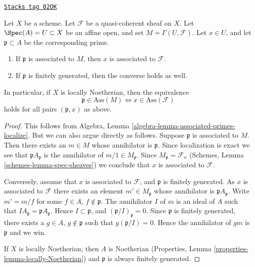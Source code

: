 \begin{lemma}
\label{divisors-lemma-associated-affine-open}
\href{https://stacks.math.columbia.edu/tag/02OK}{\texttt{Stacks tag 02OK}}

Let $X$ be a scheme. Let $\mathcal{F}$ be a quasi-coherent sheaf on $X$.
Let $\Spec(A) = U \subset X$ be an affine open, and set
$M = \Gamma(U, \mathcal{F})$.
Let $x \in U$, and let $\mathfrak p \subset A$ be the corresponding prime.
\begin{enumerate}
\item If $\mathfrak p$ is associated to $M$, then $x$ is associated
to $\mathcal{F}$.
\item If $\mathfrak p$ is finitely generated, then the converse holds
as well.
\end{enumerate}
In particular, if $X$ is locally Noetherian, then the equivalence
$$
\mathfrak p \in \text{Ass}(M) \Leftrightarrow x \in \text{Ass}(\mathcal{F})
$$
holds for all pairs $(\mathfrak p, x)$ as above.
\end{lemma}

\begin{proof}
This follows from
Algebra, Lemma \ref{algebra-lemma-associated-primes-localize}.
But we can also argue directly as follows.
Suppose $\mathfrak p$ is associated to $M$.
Then there exists an $m \in M$ whose annihilator is $\mathfrak p$.
Since localization is exact we see that
$\mathfrak pA_{\mathfrak p}$ is the annihilator of
$m/1 \in M_{\mathfrak p}$. Since $M_{\mathfrak p} = \mathcal{F}_x$
(Schemes, Lemma \ref{schemes-lemma-spec-sheaves})
we conclude that $x$ is associated to $\mathcal{F}$.

\medskip\noindent
Conversely, assume that $x$ is associated to $\mathcal{F}$,
and $\mathfrak p$ is finitely generated.
As $x$ is associated to $\mathcal{F}$
there exists an element $m' \in M_{\mathfrak p}$ whose
annihilator is $\mathfrak pA_{\mathfrak p}$. Write
$m' = m/f$ for some $f \in A$, $f \not \in \mathfrak p$.
The annihilator $I$ of $m$ is an ideal of $A$ such that
$IA_{\mathfrak p} = \mathfrak pA_{\mathfrak p}$. Hence
$I \subset \mathfrak p$, and $(\mathfrak p/I)_{\mathfrak p} = 0$.
Since $\mathfrak p$ is finitely generated,
there exists a $g \in A$, $g \not \in \mathfrak p$ such that
$g(\mathfrak p/I) = 0$. Hence the annihilator of $gm$ is
$\mathfrak p$ and we win.

\medskip\noindent
If $X$ is locally Noetherian, then $A$ is Noetherian
(Properties, Lemma \ref{properties-lemma-locally-Noetherian})
and $\mathfrak p$ is always finitely generated.
\end{proof}

